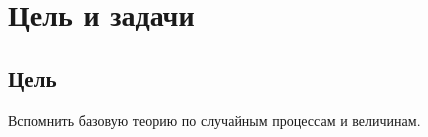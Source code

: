 \chapter*{Цель и задачи}
\label{ch:intro}

\section{Цель}
Вспомнить базовую теорию по случайным процессам и величинам.

\endinput